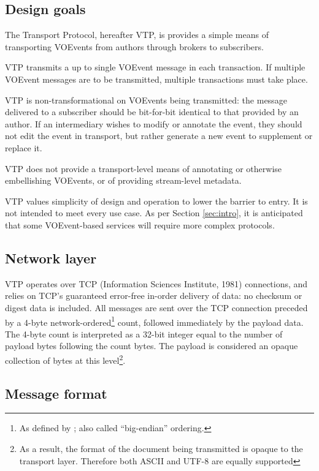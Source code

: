 \documentclass[a4paper,11pt]{ivoa}
\begin{document}
\subsection{Design goals}
\label{sec:common:design}

The Transport Protocol, hereafter VTP, is provides a simple means of
transporting VOEvents from authors through brokers to subscribers.

VTP transmits a up to single VOEvent message in each transaction. If multiple
VOEvent messages are to be transmitted, multiple transactions must take place.

VTP is non-transformational on VOEvents being transmitted: the message
delivered to a subscriber should be bit-for-bit identical to that provided by
an author. If an intermediary wishes to modify or annotate the event, they
should not edit the event in transport, but rather generate a new event to
supplement or replace it.

VTP does not provide a transport-level means of annotating or otherwise
embellishing VOEvents, or of providing stream-level metadata.

VTP values simplicity of design and operation to lower the barrier to entry. It
is not intended to meet every use case. As per Section \ref{sec:intro}, it is
anticipated that some VOEvent-based services will require more complex
protocols.

\subsection{Network layer}

VTP operates over TCP (Information Sciences Institute, 1981) connections, and
relies on TCP's guaranteed error-free in-order delivery of data: no checksum
or digest data is included. All messages are sent over the TCP connection
preceded by a 4-byte network-ordered\footnote{As defined by
\citet{Reynolds:1994}; also called ``big-endian'' ordering.} count, followed
immediately by the payload data. The 4-byte count is interpreted as a 32-bit
integer equal to the number of payload bytes following the count bytes. The
payload is considered an opaque collection of bytes at this level\footnote{As
a result, the format of the document being transmitted is opaque to the
transport layer. Therefore both ASCII and UTF-8 are equally supported}.

\subsection{Message format}
\label{sec:common:format}
\end{document}
